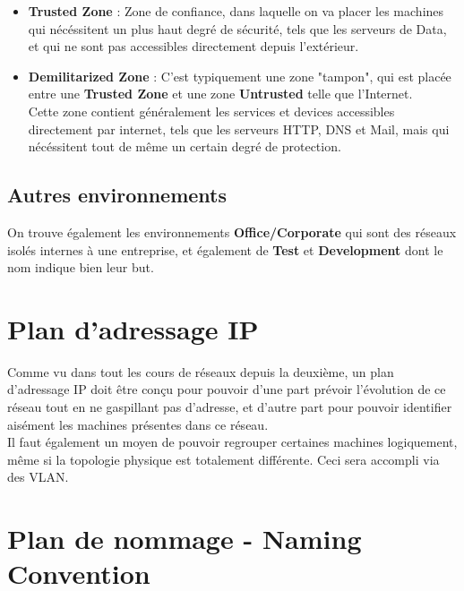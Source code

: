 \documentclass{report}
\begin{document}
			\begin{itemize}
				\item \textbf{Trusted Zone} : Zone de confiance, dans laquelle on va placer les machines qui nécéssitent un plus haut degré de sécurité, tels que les serveurs de Data, et qui ne sont pas accessibles directement depuis l'extérieur.\\

				\item \textbf{Demilitarized Zone} : C'est typiquement une zone "tampon", qui est placée entre une \textbf{Trusted Zone} et une zone \textbf{Untrusted} telle que l'Internet.\\
				Cette zone contient généralement les services et devices accessibles directement par internet, tels que les serveurs HTTP, DNS et Mail, mais qui nécéssitent tout de même un certain degré de protection.\\
			\end{itemize}

		\subsection{Autres environnements}

			On trouve également les environnements \textbf{Office/Corporate} qui sont des réseaux isolés internes à une entreprise, et également de \textbf{Test} et \textbf{Development} dont le nom indique bien leur but.\\

	\section{Plan d'adressage IP}

		Comme vu dans tout les cours de réseaux depuis la deuxième, un plan d'adressage IP doit être conçu pour pouvoir d'une part prévoir l'évolution de ce réseau tout en ne gaspillant pas d'adresse, et d'autre part pour pouvoir identifier aisément les machines présentes dans ce réseau.\\
		Il faut également un moyen de pouvoir regrouper certaines machines logiquement, même si la topologie physique est totalement différente. Ceci sera accompli via des VLAN.\\

	\section{Plan de nommage - Naming Convention}
\end{document}
